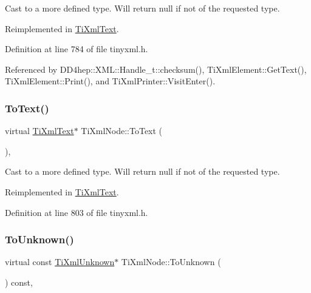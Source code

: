 Cast to a more defined type. Will return null if not of the requested type. 



Reimplemented in \hyperlink{class_ti_xml_text_af8973cfd4ca00c5d934cb23e8aa0f5d5}{Ti\+Xml\+Text}.



Definition at line 784 of file tinyxml.\+h.



Referenced by D\+D4hep\+::\+X\+M\+L\+::\+Handle\+\_\+t\+::checksum(), Ti\+Xml\+Element\+::\+Get\+Text(), Ti\+Xml\+Element\+::\+Print(), and Ti\+Xml\+Printer\+::\+Visit\+Enter().

\hypertarget{class_ti_xml_node_a3ddfbcac78fbea041fad57e5c6d60a03}{}\label{class_ti_xml_node_a3ddfbcac78fbea041fad57e5c6d60a03} 
\subsubsection{\texorpdfstring{To\+Text()}{ToText()}\hspace{0.1cm}{\footnotesize\ttfamily [2/2]}}
{\footnotesize\ttfamily virtual \hyperlink{class_ti_xml_text}{Ti\+Xml\+Text}$\ast$ Ti\+Xml\+Node\+::\+To\+Text (\begin{DoxyParamCaption}{ }\end{DoxyParamCaption})\hspace{0.3cm}{\ttfamily [inline]}, {\ttfamily [virtual]}}



Cast to a more defined type. Will return null if not of the requested type. 



Reimplemented in \hyperlink{class_ti_xml_text_ae7c3a8fd3e4dbf6c0c4363a943d72f5b}{Ti\+Xml\+Text}.



Definition at line 803 of file tinyxml.\+h.

\hypertarget{class_ti_xml_node_ab4f2e6ce87d36c1b9b7de2529128a460}{}\label{class_ti_xml_node_ab4f2e6ce87d36c1b9b7de2529128a460} 
\subsubsection{\texorpdfstring{To\+Unknown()}{ToUnknown()}\hspace{0.1cm}{\footnotesize\ttfamily [1/2]}}
{\footnotesize\ttfamily virtual const \hyperlink{class_ti_xml_unknown}{Ti\+Xml\+Unknown}$\ast$ Ti\+Xml\+Node\+::\+To\+Unknown (\begin{DoxyParamCaption}{ }\end{DoxyParamCaption}) const\hspace{0.3cm}{\ttfamily [inline]}, {\ttfamily [virtual]}}



